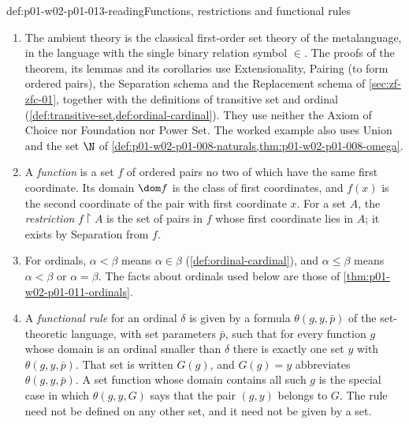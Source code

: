 \begin{hbconvention}{def:p01-w02-p01-013-reading}{Functions, restrictions and functional rules}
\begin{enumerate}
  \item The ambient theory is the classical first-order set theory of the
        metalanguage, in the language with the single binary relation symbol
        \(\in\). The proofs of the theorem, its lemmas and its corollaries use
        Extensionality, Pairing (to form ordered pairs), the Separation schema
        and the Replacement schema of \cref{sec:zf-zfc-01}, together with the
        definitions of transitive set and ordinal
        (\cref{def:transitive-set,def:ordinal-cardinal}). They use neither the
        Axiom of Choice nor Foundation nor Power Set. The worked example also
        uses Union and the set \(\N\) of \cref{def:p01-w02-p01-008-naturals,thm:p01-w02-p01-008-omega}.
  \item A \emph{function} is a set \(f\) of ordered pairs no two of which
        have the same first coordinate. Its domain \(\dom f\) is the class of
        first coordinates, and \(f(x)\) is the second coordinate of the pair
        with first coordinate \(x\). For a set \(A\), the \emph{restriction}
        \(f\mathbin{\upharpoonright}A\) is the set of pairs in \(f\) whose
        first coordinate lies in \(A\); it exists by Separation from \(f\).
  \item For ordinals, \(\alpha<\beta\) means \(\alpha\in\beta\)
        (\cref{def:ordinal-cardinal}), and \(\alpha\leq\beta\) means
        \(\alpha<\beta\) or \(\alpha=\beta\). The facts about ordinals used
        below are those of \cref{thm:p01-w02-p01-011-ordinals}.
  \item A \emph{functional rule} for an ordinal \(\delta\) is given by a
        formula \(\theta(g,y,\bar p)\) of the set-theoretic language, with
        set parameters \(\bar p\), such that for every function \(g\) whose
        domain is an ordinal smaller than \(\delta\) there is exactly one set
        \(y\) with \(\theta(g,y,\bar p)\). That set is written \(G(g)\), and
        \(G(g)=y\) abbreviates \(\theta(g,y,\bar p)\). A set function whose
        domain contains all such \(g\) is the special case in which
        \(\theta(g,y,G)\) says that the pair \((g,y)\) belongs to \(G\). The
        rule need not be defined on any other set, and it need not be given by
        a set.
\end{enumerate}
\end{hbconvention}

